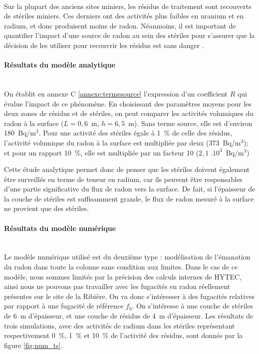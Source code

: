 \documentclass{article}
\begin{document}
\paragraph{} Sur la plupart des anciens sites miniers, les résidus de traitement sont recouverts de stériles miniers. Ces derniers ont des activités plus faibles en uranium et en radium, et donc produisent moins de radon. Néanmoins, il est important de quantifier l'impact d'une source de radon au sein des stériles pour s'assurer que la décision de les utiliser pour recouvrir les résidus est sans danger \cite{ferry_evaluation_2002}.

\paragraph{Résultats du modèle analytique \\ \\}
On établit en annexe C \ref{annexe:termesource} l'expression d'un coefficient $R$ qui évalue l'impact de ce phénomène. En choisissant des paramètres moyens pour les deux zones de résidus et de stériles, on peut comparer les activités volumiques du radon à la surface ($L=0,6$~m, $h=6,5$~m). Sans terme source, elle est d'environ 180~Bq/m$^3$. Pour une activité des stériles égale à 1~\% de celle des résidus, l'activité volumique du radon à la surface est multipliée par deux (373~Bq/m$^3$); et pour un rapport 10~\%, elle est multipliée par un facteur 10 ($2,1 \; .10^3$~Bq/m$^3$)

Cette étude analytique permet donc de penser que les stériles doivent également être surveillés en terme de teneur en radium, car ils peuvent être responsables d'une partie significative du flux de radon vers la surface. De fait, si l'épaisseur de la couche de stériles est suffisamment grande, le flux de radon mesuré à la surface ne provient que des stériles.

\paragraph{Résultats du modèle numérique \\ \\}
Le modèle numérique utilisé est du deuxième type : modélisation de l'émanation du radon dans toute la colonne sans condition aux limites. Dans le cas de ce modèle, nous sommes limités par la précision des calculs internes de HYTEC, ainsi nous ne pouvons pas travailler avec les fugacités en radon réellement présentes sur le site de la Ribière. On va donc s'intéresser à des fugacités relatives par rapport à une fugacité de référence $f_0$. On s'intéresse à une couche de stériles de 6~m d'épaisseur, et une couche de résidus de 4~m d'épaisseur. Les résultats de trois simulations, avec des activités de radium dans les stériles représentant respectivement 0~\%, 1~\% et 10~\% de l'activité des résidus, sont donnés par la figure \ref{fig:num_ts}.
\end{document}
